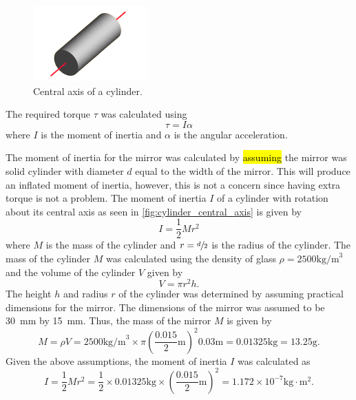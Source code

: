 \begin{figure}
    \centering
    \includegraphics[scale=1]{figures/hardware_design/cylinder_central_axis.png}
    \caption{Central axis of a cylinder.}
    \label{fig:cylinder_central_axis}
\end{figure}

The required torque $\tau$ was calculated using
\begin{equation}
    \tau = I\alpha
    \label{eq:torque}
\end{equation}
where $I$ is the moment of inertia and $\alpha$ is the angular acceleration.

The moment of inertia for the mirror was calculated by \hl{assuming} the mirror was solid cylinder with diameter $d$ equal to the width of the mirror. This will produce an inflated moment of inertia, however, this is not a concern since having extra torque is not a problem. The moment of inertia $I$ of a cylinder with rotation about its central axis as seen in \autoref{fig:cylinder_central_axis} is given by
\begin{equation}
    I = \frac{1}{2}Mr^2
    \label{eq:moment_of_inertia}
\end{equation}
where $M$ is the mass of the cylinder and $r = \sfrac{d}{2}$ is the radius of the cylinder. The mass of the cylinder $M$ was calculated using the density of glass $\rho = 2500 \text{kg/m}^3$ and the volume of the cylinder $V$ given by
\begin{equation}
    V = \pi r^2 h.
    \label{eq:cylinder_volume}
\end{equation}
The height $h$ and radius $r$ of the cylinder was determined by assuming practical dimensions for the mirror. The dimensions of the mirror was assumed to be 30~mm by 15~mm. Thus, the mass of the mirror $M$ is given by
\begin{equation}
    M = \rho V = 2500 \text{kg/m}^3 \times \pi \left(\frac{0.015}{2} \text{m}\right)^2 0.03 \text{m} = 0.01325 \text{kg} = 13.25 \text{g}.
    \label{eq:cylinder_mass}
\end{equation}
Given the above assumptions, the moment of inertia $I$ was calculated as
\begin{equation}
    I = \frac{1}{2}Mr^2 = \frac{1}{2} \times 0.01325 \text{kg} \times \left(\frac{0.015}{2} \text{m}\right)^2 = 1.172 \times 10^{-7} \text{kg} \cdot \text{m}^2.
    \label{eq:cylinder_moment_of_inertia}
\end{equation}

